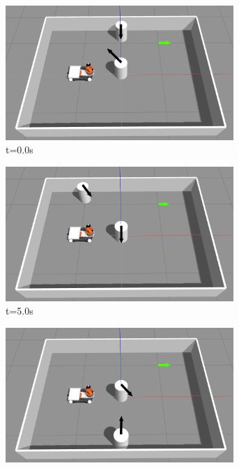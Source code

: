 \begin{figure}[H]
    \centering
    \begin{subfigure}[b]{0.50\linewidth}
        \centering
        \includegraphics[width=0.95\textwidth]{images/test_case_2/exp1.png}
        \caption{t=0.0s}
    \end{subfigure}%
    \begin{subfigure}[b]{0.50\linewidth}
        \centering
        \includegraphics[width=0.95\textwidth]{images/test_case_2/exp2.png}
        \caption{t=5.0s}
    \end{subfigure}
    \begin{subfigure}[b]{0.50\linewidth}
        \centering
        \includegraphics[width=0.95\textwidth]{images/test_case_2/exp3.png}

\end{subfigure}
\end{figure}
